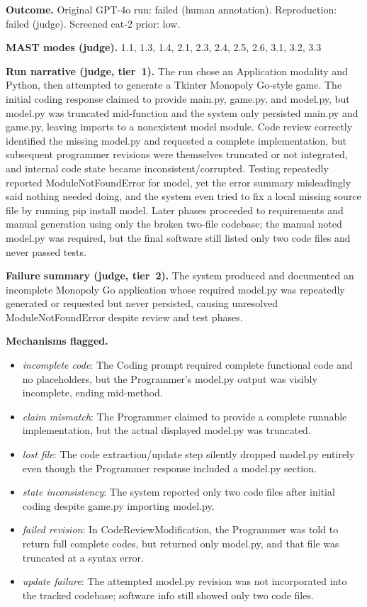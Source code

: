 \textbf{Outcome.} Original GPT-4o run: failed (human annotation). Reproduction: failed (judge). Screened cat-2 prior: low.

\textbf{MAST modes (judge).} 1.1, 1.3, 1.4, 2.1, 2.3, 2.4, 2.5, 2.6, 3.1, 3.2, 3.3

\textbf{Run narrative (judge, tier~1).} The run chose an Application modality and Python, then attempted to generate a Tkinter Monopoly Go-style game. The initial coding response claimed to provide main.py, game.py, and model.py, but model.py was truncated mid-function and the system only persisted main.py and game.py, leaving imports to a nonexistent model module. Code review correctly identified the missing model.py and requested a complete implementation, but subsequent programmer revisions were themselves truncated or not integrated, and internal code state became inconsistent/corrupted. Testing repeatedly reported ModuleNotFoundError for model, yet the error summary misleadingly said nothing needed doing, and the system even tried to fix a local missing source file by running pip install model. Later phases proceeded to requirements and manual generation using only the broken two-file codebase; the manual noted model.py was required, but the final software still listed only two code files and never passed tests.

\textbf{Failure summary (judge, tier~2).} The system produced and documented an incomplete Monopoly Go application whose required model.py was repeatedly generated or requested but never persisted, causing unresolved ModuleNotFoundError despite review and test phases.

\textbf{Mechanisms flagged.}
\begin{itemize}
  \item \emph{incomplete code}: The Coding prompt required complete functional code and no placeholders, but the Programmer's model.py output was visibly incomplete, ending mid-method.
  \item \emph{claim mismatch}: The Programmer claimed to provide a complete runnable implementation, but the actual displayed model.py was truncated.
  \item \emph{lost file}: The code extraction/update step silently dropped model.py entirely even though the Programmer response included a model.py section.
  \item \emph{state inconsistency}: The system reported only two code files after initial coding despite game.py importing model.py.
  \item \emph{failed revision}: In CodeReviewModification, the Programmer was told to return full complete codes, but returned only model.py, and that file was truncated at a syntax error.
  \item \emph{update failure}: The attempted model.py revision was not incorporated into the tracked codebase; software info still showed only two code files.
\end{itemize}

